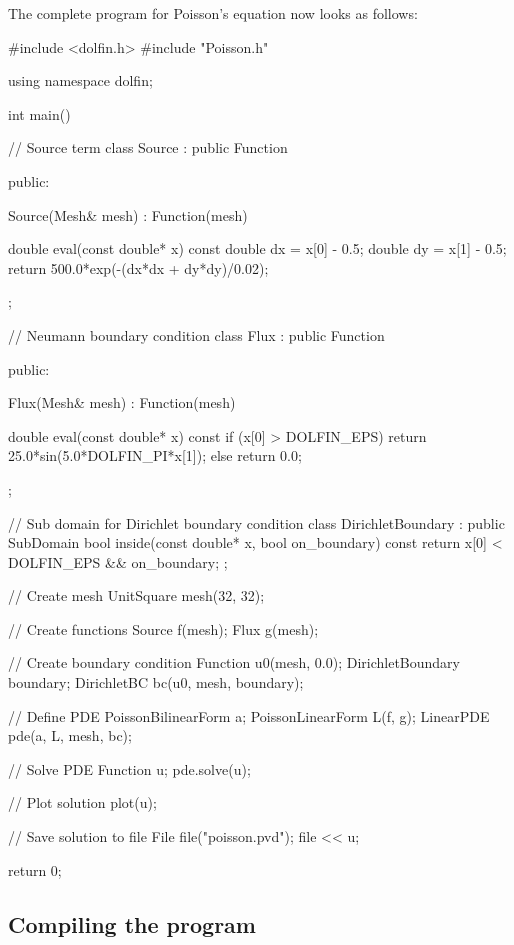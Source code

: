 The complete program for Poisson's equation now looks as follows:
\small
\begin{code}

#include <dolfin.h>
#include "Poisson.h"
  
using namespace dolfin;

int main()
{
  // Source term
  class Source : public Function
  {
  public:
    
    Source(Mesh& mesh) : Function(mesh) {}

    double eval(const double* x) const
    {
      double dx = x[0] - 0.5;
      double dy = x[1] - 0.5;
      return 500.0*exp(-(dx*dx + dy*dy)/0.02);
    }

  };

  // Neumann boundary condition
  class Flux : public Function
  {
  public:

    Flux(Mesh& mesh) : Function(mesh) {}

    double eval(const double* x) const
    {
      if (x[0] > DOLFIN_EPS)
        return 25.0*sin(5.0*DOLFIN_PI*x[1]);
      else
        return 0.0;
    }

  };

  // Sub domain for Dirichlet boundary condition
  class DirichletBoundary : public SubDomain
  {
    bool inside(const double* x, bool on_boundary) const
    {
      return x[0] < DOLFIN_EPS && on_boundary;
    }
  };

  // Create mesh
  UnitSquare mesh(32, 32);

  // Create functions
  Source f(mesh);
  Flux g(mesh);

  // Create boundary condition
  Function u0(mesh, 0.0);
  DirichletBoundary boundary;
  DirichletBC bc(u0, mesh, boundary);
  
  // Define PDE
  PoissonBilinearForm a;
  PoissonLinearForm L(f, g);
  LinearPDE pde(a, L, mesh, bc);

  // Solve PDE
  Function u;
  pde.solve(u);

  // Plot solution
  plot(u);

  // Save solution to file
  File file("poisson.pvd");
  file << u;

  return 0;
}
\end{code}
\normalsize

\subsection{Compiling the program}

